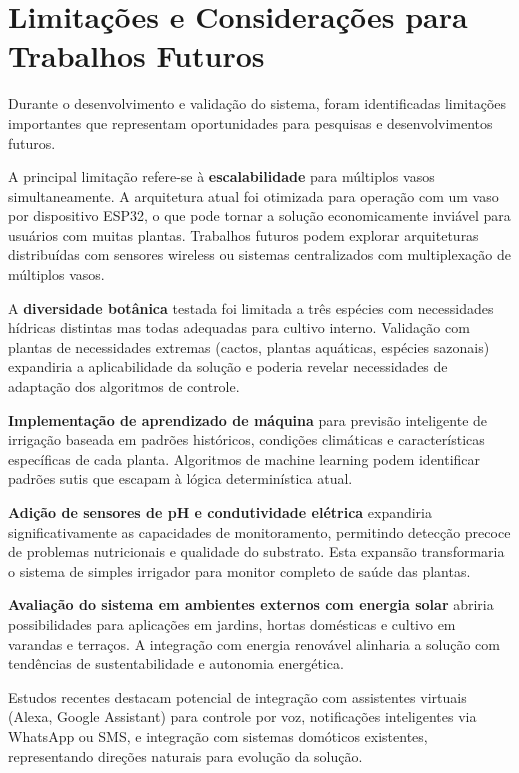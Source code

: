 \documentclass[oneside,english,brazilian]{UNISINOSmonografia}
\begin{document}
\section{Limitações e Considerações para Trabalhos Futuros}

Durante o desenvolvimento e validação do sistema, foram identificadas limitações importantes que representam oportunidades para pesquisas e desenvolvimentos futuros.

A principal limitação refere-se à \textbf{escalabilidade} para múltiplos vasos simultaneamente. A arquitetura atual foi otimizada para operação com um vaso por dispositivo ESP32, o que pode tornar a solução economicamente inviável para usuários com muitas plantas. Trabalhos futuros podem explorar arquiteturas distribuídas com sensores wireless ou sistemas centralizados com multiplexação de múltiplos vasos.

A \textbf{diversidade botânica} testada foi limitada a três espécies com necessidades hídricas distintas mas todas adequadas para cultivo interno. Validação com plantas de necessidades extremas (cactos, plantas aquáticas, espécies sazonais) expandiria a aplicabilidade da solução e poderia revelar necessidades de adaptação dos algoritmos de controle.

\textbf{Implementação de aprendizado de máquina} para previsão inteligente de irrigação baseada em padrões históricos, condições climáticas e características específicas de cada planta. Algoritmos de machine learning podem identificar padrões sutis que escapam à lógica determinística atual.

\textbf{Adição de sensores de pH e condutividade elétrica} expandiria significativamente as capacidades de monitoramento, permitindo detecção precoce de problemas nutricionais e qualidade do substrato. Esta expansão transformaria o sistema de simples irrigador para monitor completo de saúde das plantas.

\textbf{Avaliação do sistema em ambientes externos com energia solar} abriria possibilidades para aplicações em jardins, hortas domésticas e cultivo em varandas e terraços. A integração com energia renovável alinharia a solução com tendências de sustentabilidade e autonomia energética.

Estudos recentes destacam potencial de integração com assistentes virtuais (Alexa, Google Assistant) para controle por voz, notificações inteligentes via WhatsApp ou SMS, e integração com sistemas domóticos existentes, representando direções naturais para evolução da solução.
\end{document}
